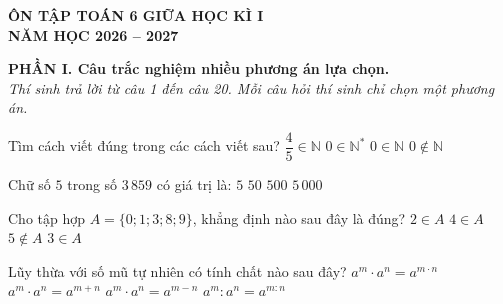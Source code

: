 
\begin{center}
	{\Large\bfseries ÔN TẬP TOÁN 6 GIỮA HỌC KÌ I}\\[4pt]
	\textbf{NĂM HỌC 2026 -- 2027}
\end{center}

\vspace{6pt}

\noindent\textbf{PHẦN I. Câu trắc nghiệm nhiều phương án lựa chọn.}\\
\textit{Thí sinh trả lời từ câu 1 đến câu 20. Mỗi câu hỏi thí sinh chỉ chọn một phương án.}

\setcounter{ex}{0}

\begin{ex}%
	Tìm cách viết đúng trong các cách viết sau?
	\choice
	{$\dfrac{4}{5} \in \mathbb{N}$}
	{$0 \in \mathbb{N}^*$}
	{\True $0 \in \mathbb{N}$}
	{$0 \notin \mathbb{N}$}
\end{ex}

\begin{ex}%
	Chữ số $5$ trong số $3\,859$ có giá trị là:
	\choice
	{$5$}
	{\True $50$}
	{$500$}
	{$5\,000$}
\end{ex}

\begin{ex}%
	Cho tập hợp $A = \{0; 1; 3; 8; 9\}$, khẳng định nào sau đây là đúng?
	\choice
	{$2 \in A$}
	{$4 \in A$}
	{$5 \notin A$}
	{\True $3 \in A$}
\end{ex}

\begin{ex}%
	Lũy thừa với số mũ tự nhiên có tính chất nào sau đây?
	\choice
	{$a^m \cdot a^n = a^{m \cdot n}$}
	{\True $a^m \cdot a^n = a^{m+n}$}
	{$a^m \cdot a^n = a^{m-n}$}
	{$a^m : a^n = a^{m:n}$}
\end{ex}

